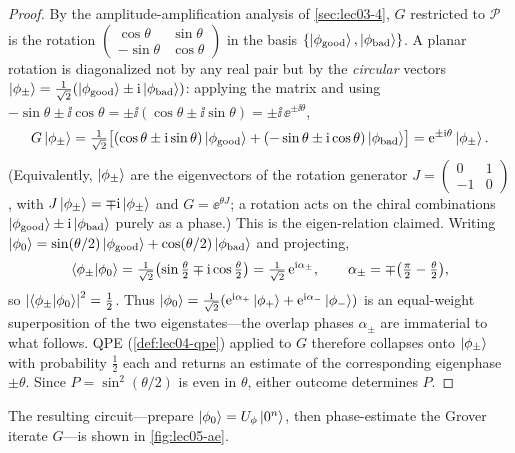 \begin{proof}
By the amplitude-amplification analysis of \cref{sec:lec03-4}, $G$ restricted to
$\mathcal P$ is the rotation
$\left(\begin{smallmatrix}\cos\theta&\sin\theta\\-\sin\theta&\cos\theta
\end{smallmatrix}\right)$ in the basis
$\{\ket{\phi_{\mathrm{good}}},\ket{\phi_{\mathrm{bad}}}\}$. A planar rotation is
diagonalized not by any real pair but by the \emph{circular} vectors
$\ket{\phi_\pm}=\tfrac{1}{\sqrt2}(\ket{\phi_{\mathrm{good}}}
\pm\mathrm{i}\ket{\phi_{\mathrm{bad}}})$: applying the matrix and using
$-\sin\theta\pm\ii\cos\theta=\pm\ii(\cos\theta\pm\ii\sin\theta)=\pm\ii\,\ee^{\pm\ii\theta}$,
\[
  G\ket{\phi_\pm}
  =\tfrac{1}{\sqrt2}\bigl[(\cos\theta\pm\mathrm{i}\sin\theta)\ket{\phi_{\mathrm{good}}}
      +(-\sin\theta\pm\mathrm{i}\cos\theta)\ket{\phi_{\mathrm{bad}}}\bigr]
  =\mathrm{e}^{\pm\mathrm{i}\theta}\ket{\phi_\pm}.
\]
(Equivalently, $\ket{\phi_\pm}$ are the eigenvectors of the rotation generator
$J=\left(\begin{smallmatrix}0&1\\-1&0\end{smallmatrix}\right)$, with
$J\ket{\phi_\pm}=\mp\mathrm{i}\ket{\phi_\pm}$ and $G=\ee^{\theta J}$; a rotation acts on the
chiral combinations $\ket{\phi_{\mathrm{good}}}\pm\mathrm{i}\ket{\phi_{\mathrm{bad}}}$ purely
as a phase.) This is the eigen-relation claimed. Writing
$\ket{\phi_0}=\sin(\theta/2)\ket{\phi_{\mathrm{good}}}
+\cos(\theta/2)\ket{\phi_{\mathrm{bad}}}$ and projecting,
\[
  \braket{\phi_{\pm}|\phi_0}
  =\tfrac{1}{\sqrt2}\bigl(\sin\tfrac{\theta}{2}\mp\mathrm{i}\cos\tfrac{\theta}{2}\bigr)
  =\tfrac{1}{\sqrt2}\,\mathrm{e}^{\mathrm{i}\alpha_\pm},
  \qquad \alpha_\pm=\mp\bigl(\tfrac{\pi}{2}-\tfrac{\theta}{2}\bigr),
\]
so $\left\lvert \braket{\phi_{\pm}|\phi_0} \right\rvert^2=\tfrac12$. Thus
$\ket{\phi_0}=\tfrac{1}{\sqrt2}(\mathrm{e}^{\mathrm{i}\alpha_+}\ket{\phi_+}
+\mathrm{e}^{\mathrm{i}\alpha_-}\ket{\phi_-})$ is an equal-weight superposition of the two
eigenstates---the overlap phases $\alpha_\pm$ are immaterial to what follows. QPE
(\cref{def:lec04-qpe}) applied to $G$ therefore collapses onto $\ket{\phi_\pm}$ with
probability $\tfrac12$ each and returns an estimate of the corresponding eigenphase
$\pm\theta$. Since $P=\sin^2(\theta/2)$ is even in $\theta$, either outcome determines
$P$.
\end{proof}

The resulting circuit---prepare $\ket{\phi_0}=U_{\phi}\ket{0^n}$, then phase-estimate the
Grover iterate $G$---is shown in \cref{fig:lec05-ae}.

